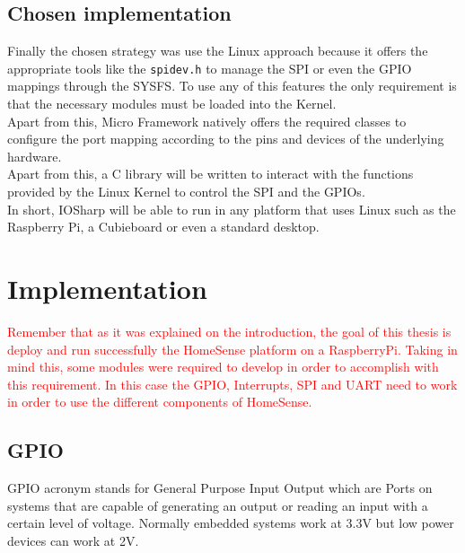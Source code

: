 \subsection{Chosen implementation}\label{SS:IOSharp-choosen}
Finally the chosen strategy was use the Linux approach because it offers the appropriate tools like the \verb!spidev.h! to manage the SPI or even the GPIO mappings through the \gls{SYSFS}. To use any of this features the only requirement is that the necessary modules must be loaded into the Kernel.
\\
Apart from this, Micro Framework natively offers the required classes to configure the port mapping according to the pins and devices of the underlying hardware.
\\
Apart from this, a C library will be written to interact with the functions provided by the Linux Kernel to control the \gls{SPI} and the \gls{GPIO}s.
\\
In short, IOSharp will be able to run in any platform that uses Linux such as the Raspberry Pi, a Cubieboard or even a standard desktop.

\section{Implementation}\label{S:Implementation}
\textcolor{red}{Remember that as it was explained on the introduction, the goal of this thesis is deploy and run successfully the HomeSense platform on a RaspberryPi. Taking in mind this, some modules were required to develop in order to accomplish with this requirement. In this case the GPIO, Interrupts, SPI and UART need to work in order to use the different components of HomeSense.}

\subsection{GPIO}\label{SS:GPIO}
GPIO acronym stands for General Purpose Input Output which are Ports on systems that are capable of generating an output or reading an input with a certain level of voltage. Normally embedded systems work at 3.3V but low power devices can work at 2V.

